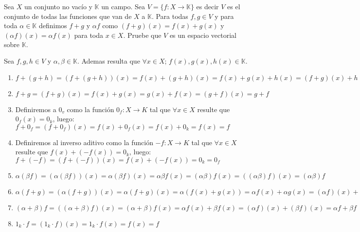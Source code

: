 \documentclass[answers]{exam}
\begin{document}
\begin{questions}
	\question Sea $X$ un conjunto no vac\'io y $\mathbb{K}$ un campo. Sea $V=\{f : X \to \mathbb{K}\}$ es decir $V$ es el conjunto de todas las funciones que van de $X$ a $\mathbb{K}$. Para todas $f,g\in V$ y para toda $\alpha \in \mathbb{K}$ definimos $f+g$ y $\alpha f$ como $(f+g)(x)=f(x)+g(x)$ y $(\alpha f)(x)=\alpha f(x)$ para toda $x\in X$. Pruebe que $V$ es un espacio vectorial sobre $\mathbb{K}$.
	\begin{solution}
		Sea $f,g,h\in V$ y $\alpha,\beta\in \mathbb{K}$. Ademas resulta que $\forall x\in X$; $f(x),g(x),h(x)\in \mathbb{K}$.
		\begin{enumerate}[label=\roman*)]
			\item $f+(g+h)=(f+(g+h))(x)=f(x)+(g+h)(x)=f(x)+g(x)+h(x)=(f+g)(x)+h(x)=((f+g)+h)(x)=(f+g)+h$
			\item $f+g=(f+g)(x)=f(x)+g(x)=g(x)+f(x)=(g+f)(x)=g+f$
			\item Definiremos a $0_v$ como la funci\'on $0_f:X \to K$ tal que $\forall x\in X$ resulte que $0_f(x)=0_k$, luego:\\
			$f+0_f=(f+0_f)(x)=f(x)+0_f(x)=f(x)+0_k=f(x)=f$
			\item Definiremos al inverso aditivo como la funci\'on $-f:X\to K$ tal que $\forall x\in X$ resulte que $f(x)+(-f(x))=0_k$, luego: \\
			$f+(-f)=(f+(-f))(x)=f(x)+(-f(x))=0_k=0_f$
			\item $
				\alpha(\beta f)=(\alpha(\beta f))(x)=\alpha(\beta f)(x)=\alpha \beta f(x)=(\alpha \beta)f(x)=((\alpha \beta)f)(x)=(\alpha \beta)f
				$
			\item $
				\alpha(f+g)=(\alpha(f+g))(x)=\alpha(f+g)(x)=\alpha(f(x)+g(x))=\alpha f(x)+\alpha g(x)=(\alpha f)(x)+(\alpha g)(x)=\alpha f+\alpha g
				$
			\item $
				(\alpha+\beta)f=((\alpha+\beta)f)(x)=(\alpha+\beta)f(x)=\alpha f(x)+\beta f(x)=(\alpha f)(x)+(\beta f)(x)=\alpha f+\beta f
				$
			\item $
				1_k\cdot f=(1_k\cdot f)(x)=1_k\cdot f(x)=f(x)=f
				$
		\end{enumerate}
	\end{solution}


\end{questions}
\end{document}
